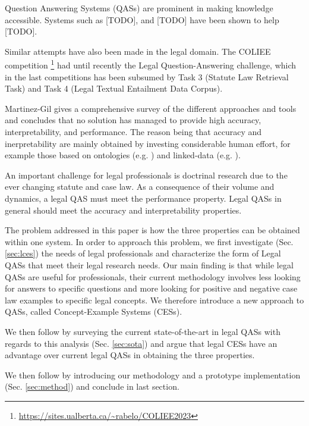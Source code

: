 Question Answering Systems (QASs) are prominent in making knowledge accessible. Systems such as [TODO], and [TODO] have been shown to help [TODO]. 


Similar attempts have also been made in the legal domain. The COLIEE competition \footnote{\url{https://sites.ualberta.ca/~rabelo/COLIEE2023}} had until recently the Legal Question-Answering challenge, which in the last competitions has been subsumed by Task 3 (Statute Law Retrieval Task) and Task 4 (Legal Textual Entailment Data Corpus). 

Martinez-Gil \cite{martinez2023survey} gives a comprehensive survey of the different approaches and tools and concludes that no solution has managed to provide high accuracy, interpretability, and performance. The reason being that accuracy and inerpretability are mainly obtained by investing considerable human effort, for example those based on ontologies (e.g. \cite{fawei2018methodology}) and linked-data (e.g. \cite{filtz2021linked}).

An important challenge for legal professionals is doctrinal research \cite{sanderson2021practical} due to the ever changing statute and case law. As a consequence of their volume and dynamics, a legal QAS must meet the performance property. Legal QASs in general should meet the accuracy and interpretability properties. 

The problem addressed in this paper is how the three properties can be obtained within one system. In order to approach this problem, we first investigate (Sec. \ref{sec:lces}) the needs of legal professionals and characterize the form of Legal QASs that meet their legal research needs. Our main finding is that while legal QASs are useful for professionals, their current methodology involves less looking for answers to specific questions and more looking for positive and negative case law examples to specific legal concepts. We therefore introduce a new approach to QASs, called Concept-Example Systems (CESs). 

We then follow by surveying the current state-of-the-art in legal QASs with regards to this analysis (Sec. \ref{sec:sota}) and argue that legal CESs have an advantage over current legal QASs in obtaining the three properties.

We then follow by introducing our methodology and a prototype implementation (Sec. \ref{sec:method}) and conclude in last section.